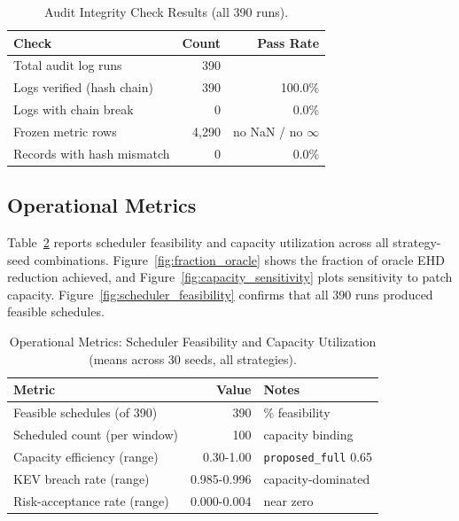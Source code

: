 \documentclass[journal]{IEEEtran}
\begin{document}
\begin{table}[t]
\caption{Audit Integrity Check Results (all 390 runs).}
\label{tab:audit_integrity}
\centering
\footnotesize
\begin{tabular}{@{}lrr@{}}
\toprule
\textbf{Check} & \textbf{Count} & \textbf{Pass Rate} \\
\midrule
Total audit log runs        & 390    & \\
Logs verified (hash chain)  & 390    & 100.0\% \\
Logs with chain break       & 0      & 0.0\% \\
Frozen metric rows          & 4{,}290 & no NaN / no $\infty$ \\
Records with hash mismatch  & 0      & 0.0\% \\
\bottomrule
\end{tabular}
\end{table}

\subsection{Operational Metrics}

Table~\ref{tab:operational} reports scheduler feasibility and
capacity utilization across all strategy-seed combinations.
Figure~\ref{fig:fraction_oracle} shows the fraction of oracle
EHD reduction achieved, and Figure~\ref{fig:capacity_sensitivity}
plots sensitivity to patch capacity.
Figure~\ref{fig:scheduler_feasibility} confirms that all 390 runs
produced feasible schedules.

\begin{table}[t]
\caption{Operational Metrics: Scheduler Feasibility and
         Capacity Utilization (means across 30 seeds,
         all strategies).}
\label{tab:operational}
\centering
\footnotesize
\setlength{\tabcolsep}{4pt}
\begin{tabular}{@{} >{\raggedright\arraybackslash}p{3.3cm} r >{\raggedright\arraybackslash}p{2.2cm} @{}}
\toprule
\textbf{Metric} & \textbf{Value} & \textbf{Notes} \\
\midrule
Feasible schedules (of 390)    & 390    & 100\% feasibility \\
Scheduled count (per window)   & 100    & capacity binding \\
Capacity efficiency (range)    & 0.30-1.00 & \texttt{proposed\_full} 0.65 \\
KEV breach rate (range)        & 0.985-0.996 & capacity-dominated \\
Risk-acceptance rate (range)   & 0.000-0.004 & near zero \\
\bottomrule
\end{tabular}
\end{table}
\end{document}
